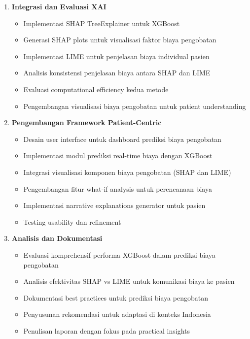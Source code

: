 \begin{enumerate}
    \item \textbf{Integrasi dan Evaluasi XAI}
    \begin{itemize}
        \item Implementasi SHAP TreeExplainer untuk XGBoost
        \item Generasi SHAP plots untuk visualisasi faktor biaya pengobatan
        \item Implementasi LIME untuk penjelasan biaya individual pasien
        \item Analisis konsistensi penjelasan biaya antara SHAP dan LIME
        \item Evaluasi computational efficiency kedua metode
        \item Pengembangan visualisasi biaya pengobatan untuk patient understanding
    \end{itemize}
    
    \item \textbf{Pengembangan Framework Patient-Centric}
    \begin{itemize}
        \item Desain user interface untuk dashboard prediksi biaya pengobatan
        \item Implementasi modul prediksi real-time biaya dengan XGBoost
        \item Integrasi visualisasi komponen biaya pengobatan (SHAP dan LIME)
        \item Pengembangan fitur what-if analysis untuk perencanaan biaya
        \item Implementasi narrative explanations generator untuk pasien
        \item Testing usability dan refinement
    \end{itemize}
    
    \item \textbf{Analisis dan Dokumentasi}
    \begin{itemize}
        \item Evaluasi komprehensif performa XGBoost dalam prediksi biaya pengobatan
        \item Analisis efektivitas SHAP vs LIME untuk komunikasi biaya ke pasien
        \item Dokumentasi best practices untuk prediksi biaya pengobatan
        \item Penyusunan rekomendasi untuk adaptasi di konteks Indonesia
        \item Penulisan laporan dengan fokus pada practical insights
    \end{itemize}
\end{enumerate}


